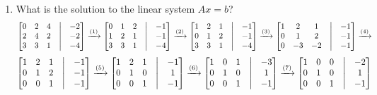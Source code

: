 \documentclass{article}
\begin{document}
\begin{aprob}
\begin{enumerate}
    	\item {} What is the solution to the linear system $Ax = b$?
\begin{equation}    	
\begin{bmatrix}
    0 & 2 & 4 &\bigm|& -2 \\
    2 & 4 & 2 &\bigm|& -2 \\
    3 & 3 & 1 &\bigm|& -4
\end{bmatrix} \xrightarrow{\text{(1)}} 
\begin{bmatrix}
    0 & 1 & 2 &\bigm|& -1 \\
    1 & 2 & 1 &\bigm|& -1 \\
    3 & 3 & 1 &\bigm|& -4
\end{bmatrix} \xrightarrow{\text{(2)}}
\begin{bmatrix}
    1 & 2 & 1 &\bigm|& -1 \\
    0 & 1 & 2 &\bigm|& -1 \\
    3 & 3 & 1 &\bigm|& -4
\end{bmatrix} \xrightarrow{\text{(3)}}
\begin{bmatrix}
    1 & 2 & 1 &\bigm|& -1 \\
    0 & 1 & 2 &\bigm|& -1 \\
    0 & -3 & -2 &\bigm|& -1
\end{bmatrix} \xrightarrow{\text{(4)}}
\end{equation}
\begin{equation} 
\begin{bmatrix}
    1 & 2 & 1 &\bigm|& -1 \\
    0 & 1 & 2 &\bigm|& -1 \\
    0 & 0 & 1 &\bigm|& -1
\end{bmatrix} \xrightarrow{\text{(5)}}
\begin{bmatrix}
    1 & 2 & 1 &\bigm|& -1 \\
    0 & 1 & 0 &\bigm|& 1 \\
    0 & 0 & 1 &\bigm|& -1
\end{bmatrix} \xrightarrow{\text{(6)}}
\begin{bmatrix}
    1 & 0 & 1 &\bigm|& -3 \\
    0 & 1 & 0 &\bigm|& 1 \\
    0 & 0 & 1 &\bigm|& -1
\end{bmatrix} \xrightarrow{\text{(7)}}
\begin{bmatrix}
    1 & 0 & 0 &\bigm|& -2 \\
    0 & 1 & 0 &\bigm|& 1 \\
    0 & 0 & 1 &\bigm|& -1
\end{bmatrix}
\end{equation}    


\end{enumerate}
\end{aprob}
\end{document}
